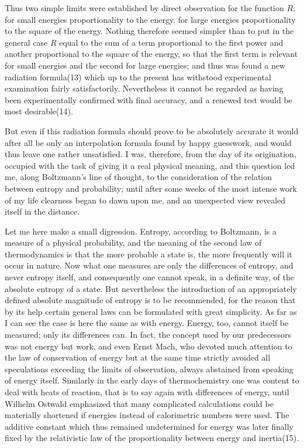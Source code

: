 \documentclass[12pt,oneside]{book}
\begin{document}
Thus two simple limits were established by direct
observation for the function $R$: for small energies proportionality
to the energy, for large energies proportionality to
the square of the energy. Nothing therefore seemed
simpler than to put in the general case $R$ equal to the sum
of a term proportional to the first power and another
proportional to the square of the energy, so that the first
term is relevant for small energies and the second for large
energies; and thus was found a new radiation formula(13)
which up to the present has withstood experimental
examination fairly satisfactorily. Nevertheless it cannot
be regarded as having been experimentally confirmed with
final accuracy, and a renewed test would be most
desirable(14).

But even if this radiation formula should prove to be
absolutely accurate it would after all be only an interpolation
formula found by happy guesswork, and would thus
leave one rather unsatisfied. I was, therefore, from the
day of its origination, occupied with the task of giving it
a real physical meaning, and this question led me, along
Boltzmann's line of thought, to the consideration of the
relation between entropy and probability; until after some
weeks of the most intense work of my life clearness began
to dawn upon me, and an unexpected view revealed itself
in the distance.

Let me here make a small digression. Entropy,
according to Boltzmann, is a measure of a physical probability,
and the meaning of the second law of thermodynamics
is that the more probable a state is, the more
frequently will it occur in nature. Now what one measures
are only the differences of entropy, and never entropy
itself, and consequently one cannot speak, in a definite
way, of the absolute entropy of a state. But nevertheless
the introduction of an appropriately defined absolute
magnitude of entropy is to be recommended, for the reason
that by its help certain general laws can be formulated
with great simplicity. As far as I can see the case is here
the same as with energy. Energy, too, cannot itself be
measured; only its differences can. In fact, the concept
used by our predecessors was not energy but work, and
even Ernst Mach, who devoted much attention to the law
of conservation of energy but at the same time strictly
avoided all speculations exceeding the limits of observation,
always abstained from speaking of energy itself. Similarly
in the early days of thermochemistry one was content to
deal with heats of reaction, that is to say again with
differences of energy, until Wilhelm Ostwald emphasized
that many complicated calculations could be materially
shortened if energies instead of calorimetric numbers were
used. The additive constant which thus remained undetermined
for energy was later finally fixed by the
relativistic law of the proportionality between energy and
inertia(15).
\end{document}
